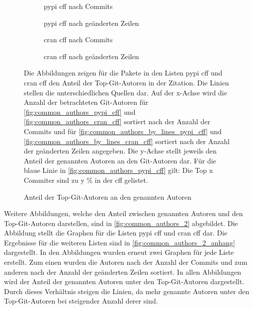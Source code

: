 \begin{figure}
    \begin{subfigure}{.5\textwidth}
        \centering
        
        \caption{\gls{pypi} \gls{cff} nach Commits}
        \label{fig:common_authors_pypi_cff}
    \end{subfigure}%
    \begin{subfigure}{.5\textwidth}
        \centering
        
        \caption{\gls{pypi} \gls{cff} nach geänderten Zeilen}
        \label{fig:common_authors_by_lines_pypi_cff}
    \end{subfigure}
    \begin{subfigure}{.5\textwidth}
        \centering
        
        \caption{\gls{cran} \gls{cff} nach Commits}
        \label{fig:common_authors_cran_cff}
    \end{subfigure}%
    \begin{subfigure}{.5\textwidth}
        \centering
        
        \caption{\gls{cran} \gls{cff} nach geänderten Zeilen}
        \label{fig:common_authors_by_lines_cran_cff}
    \end{subfigure}
    \caption{Anteil der Top-Git-Autoren an den genannten Autoren}
    \label{fig:common_authors}
    \small
    Die Abbildungen zeigen für die Pakete in den Listen \gls{pypi} \gls{cff} und \gls{cran} \gls{cff} den Anteil der Top-Git-Autoren in der Zitation. Die Linien stellen die unterschiedlichen Quellen dar. Auf der x-Achse wird die Anzahl der betrachteten Git-Autoren für \autoref{fig:common_authors_pypi_cff} und \autoref{fig:common_authors_cran_cff} sortiert nach der Anzahl der Commits und für \autoref{fig:common_authors_by_lines_pypi_cff} und \autoref{fig:common_authors_by_lines_cran_cff} sortiert nach der Anzahl der geänderten Zeilen angegeben. Die y-Achse stellt jeweils den Anteil der genannten Autoren an den Git-Autoren dar. Für die blaue Linie in \autoref{fig:common_authors_pypi_cff} gilt: Die Top x Commiter sind zu y \% in der \gls{cff} gelistet.
\end{figure}

Weitere Abbildungen, welche den Anteil zwischen genannten Autoren und den Top-Git-Autoren darstellen, sind in \autoref{fig:common_authors_2} abgebildet.
Die Abbildung stellt die Graphen für die Listen \gls{pypi} \gls{cff} und \gls{cran} \gls{cff} dar.
Die Ergebnisse für die weiteren Listen sind in \autoref{fig:common_authors_2_anhang} dargestellt.
In den Abbildungen wurden erneut zwei Graphen für jede Liste erstellt.
Zum einen wurden die Autoren nach der Anzahl der Commits und zum anderen nach der Anzahl der geänderten Zeilen sortiert.
In allen Abbildungen wird der Anteil der genannten Autoren unter den Top-Git-Autoren dargestellt.
Durch dieses Verhältnis steigen die Linien, da mehr genannte Autoren unter den Top-Git-Autoren bei steigender Anzahl derer sind.

